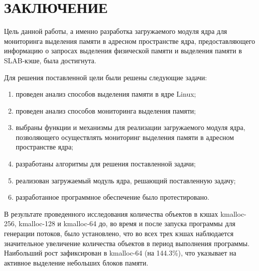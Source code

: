 \section*{ЗАКЛЮЧЕНИЕ}

Цель данной работы, а именно разработка загружаемого модуля ядра для мониторинга выделения памяти в адресном пространстве ядра, предоставляющего информацию о запросах выделения физической памяти и выделения памяти в SLAB-кэше, была достигнута.

Для решения поставленной цели были решены следующие задачи:
\begin{enumerate}
    \item проведен анализ способов выделения памяти в ядре Linux;
    \item проведен анализ способов мониторинга выделения памяти;
    \item выбраны функции и механизмы для реализации загружаемого модуля ядра, позволяющего осуществлять мониторинг выделения памяти в адресном пространстве ядра;
    \item разработаны алгоритмы для решения поставленной задачи;
    \item реализован загружаемый модуль ядра, решающий поставленную задачу;
    \item разработанное программное обеспечение было протестировано.
\end{enumerate}

В результате проведенного исследования количества объектов в кэшах kmalloc-256, kmalloc-128 и kmalloc-64 до, во время и после запуска программы для генерации потоков, было установлено, что во всех трех кэшах наблюдается значительное увеличение количества объектов в период выполнения программы.
Наибольший рост зафиксирован в kmalloc-64 (на 144.3\%), что указывает на активное выделение небольших блоков памяти.
